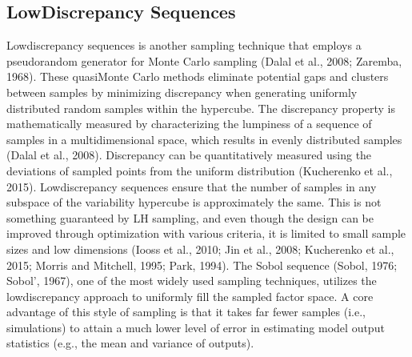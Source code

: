 \documentclass[letterpaper,10pt,english]{sphinxmanual}
\begin{document}
\subsection{Low\sphinxhyphen{}Discrepancy Sequences}
\label{\detokenize{3_sensitivity_analysis_the_basics:low-discrepancy-sequences}}
\sphinxAtStartPar
Low\sphinxhyphen{}discrepancy sequences is another sampling technique that employs a pseudo\sphinxhyphen{}random generator for Monte Carlo sampling (Dalal et al., 2008; Zaremba, 1968). These quasi\sphinxhyphen{}Monte Carlo methods eliminate potential gaps and clusters between samples by minimizing discrepancy when generating uniformly distributed random samples within the hypercube. The discrepancy property is mathematically measured by characterizing the lumpiness of a sequence of samples in a multidimensional space, which results in evenly distributed samples (Dalal et al., 2008). Discrepancy can be quantitatively measured using the deviations of sampled points from the uniform distribution (Kucherenko et al., 2015). Low\sphinxhyphen{}discrepancy sequences ensure that the number of samples in any subspace of the variability hypercube is approximately the same. This is not something guaranteed by LH sampling, and even though the design can be improved through optimization with various criteria, it is limited to small sample sizes and low dimensions (Iooss et al., 2010; Jin et al., 2008; Kucherenko et al., 2015; Morris and Mitchell, 1995; Park, 1994). The Sobol sequence (Sobol, 1976; Sobol’, 1967), one of the most widely used sampling techniques, utilizes the low\sphinxhyphen{}discrepancy approach to uniformly fill the sampled factor space. A core advantage of this style of sampling is that it takes far fewer samples (i.e., simulations) to attain a much lower level of error in estimating model output statistics (e.g., the mean and variance of outputs).
\end{document}
